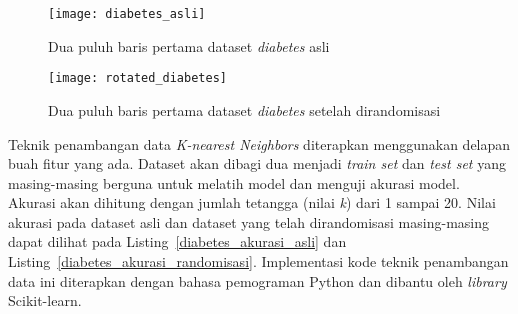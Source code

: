 \begin{figure}
	\centering
	\texttt{[image: diabetes\_asli]}
	\caption{Dua puluh baris pertama dataset \textit{diabetes} asli}
	\label{fig:diabetes_asli}
\end{figure}

\begin{figure}
	\centering
	\texttt{[image: rotated\_diabetes]}
	\caption{Dua puluh baris pertama dataset \textit{diabetes} setelah dirandomisasi}
	\label{fig:rotated_diabetes}
\end{figure}

Teknik penambangan data \textit{K-nearest Neighbors} diterapkan menggunakan delapan buah fitur yang ada. Dataset akan dibagi dua menjadi \textit{train set} dan \textit{test set} yang masing-masing berguna untuk melatih model dan menguji akurasi model. Akurasi akan dihitung dengan jumlah tetangga (nilai \textit{k}) dari 1 sampai 20. Nilai akurasi pada dataset asli dan dataset yang telah dirandomisasi masing-masing dapat dilihat pada Listing~\ref{diabetes_akurasi_asli} dan Listing~\ref{diabetes_akurasi_randomisasi}. Implementasi kode teknik penambangan data ini diterapkan dengan bahasa pemograman Python dan dibantu oleh \textit{library} Scikit-learn. 

